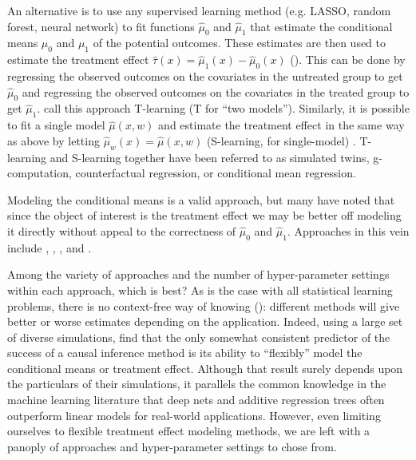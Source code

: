 An alternative is to use any supervised learning method (e.g. LASSO, random forest, neural network) to fit functions $\hat\mu_0$ and $\hat\mu_1$ that estimate the conditional means $\mu_0$ and $\mu_1$ of the potential outcomes. These estimates are then used to estimate the treatment effect $\hat\tau(x) = \hat\mu_1(x) - \hat\mu_0(x)$ (\citealp{Gutierrez:2016tq, Austin:2012cy, Snowdn:2011ef}). This can be done by regressing the observed outcomes on the covariates in the untreated group to get $\hat\mu_0$ and regressing the observed outcomes on the covariates in the treated group to get $\hat\mu_1$. \citet{Kunzel:2017vg} call this approach T-learning (T for ``two models''). Similarly, it is possible to fit a single model $\hat\mu(x,w)$ and estimate the treatment effect in the same way as above by letting $\hat\mu_w(x) = \hat\mu(x,w)$ (S-learning, for single-model) \citealp{Kunzel:2017vg}. T-learning and S-learning together have been referred to as simulated twins, g-computation, counterfactual regression, or conditional mean regression. 

Modeling the conditional means is a valid approach, but many have noted that since the object of interest is the treatment effect we may be better off modeling it directly without appeal to the correctness of $\hat\mu_0$ and $\hat\mu_1$. Approaches in this vein include \citet{Zhao:2017vi}, \citet{Athey:2016wm}, \citet{Powers:2017wd}, and \citet{Nie:2017vi}. 

Among the variety of approaches and the number of hyper-parameter settings within each approach, which is best? As is the case with all statistical learning problems, there is no context-free way of knowing (\citealp{Wolpert:1996fp}): different methods will give better or worse estimates depending on the application. Indeed, using a large set of diverse simulations, \citet{Dorie:2017uo} find that the only somewhat consistent predictor of the success of a causal inference method is its ability to ``flexibly'' model the conditional means or treatment effect. Although that result surely depends upon the particulars of their simulations, it parallels the common knowledge in the machine learning literature that deep nets and additive regression trees often outperform linear models for real-world applications. However, even limiting ourselves to flexible treatment effect modeling methods, we are left with a panoply of approaches and hyper-parameter settings to chose from. 

